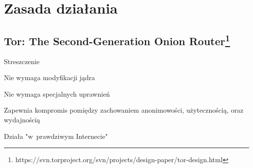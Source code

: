 \section{Zasada działania}

\subsection{Tor: The Second-Generation Onion Router\protect\footnote{https://svn.torproject.org/svn/projects/design-paper/tor-design.html}}
\begin{description}
  \item Streszczenie
  \begin{description}
   \item Nie wymaga modyfikacji jądra
   \item Nie wymaga specjalnych uprawnień
   \item Zapewnia kompromis pomiędzy zachowaniem anonimowości, użytecznością, oraz wydajnością
   \item Działa "w~prawdziwym Internecie"
  \end{description}


\end{description}
